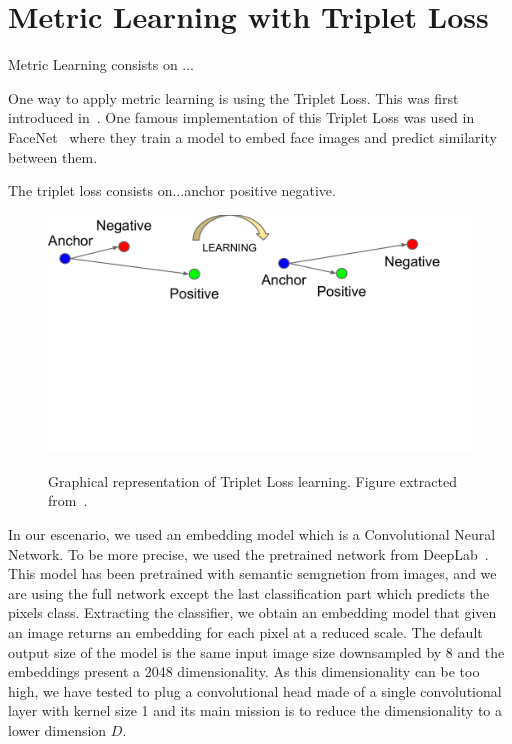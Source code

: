 \section{Metric Learning with Triplet Loss}
\label{sec:methods_metriclearning}


Metric Learning consists on ...

One way to apply metric learning is using the Triplet Loss. This was first introduced in~\cite{balntas2016learning}.
One famous implementation of this Triplet Loss was used in FaceNet~\cite{schroff2015facenet} where they train a model to embed face images and predict similarity between them.

The triplet loss consists on...anchor positive negative.

\begin{figure}[h]
  \centering
  \includegraphics[trim=1cm 10cm 2.5cm 0cm, width=0.7\linewidth]{figures/methods/triplet_loss/triplet_viz.pdf}
  \label{fig:triplet_loss_viz}
  \caption{
    Graphical representation of Triplet Loss learning.
    Figure extracted from~\cite{schroff2015facenet}. }
\end{figure}

In our escenario, we used an embedding model which is a Convolutional Neural Network.
To be more precise, we used the pretrained network from DeepLab~\cite{chen2018deeplab}.
This model has been pretrained with semantic semgnetion from images, and we are using the full network except the last classification part which predicts the pixels class.
Extracting the classifier, we obtain an embedding model that given an image returns an embedding for each pixel at a reduced scale.
The default output size of the model is the same input image size downsampled by 8 and the embeddings present a 2048 dimensionality.
As this dimensionality can be too high, we have tested to plug a convolutional head made of a single convolutional layer with kernel size 1 and its main mission is to reduce the dimensionality to a lower dimension $D$.

